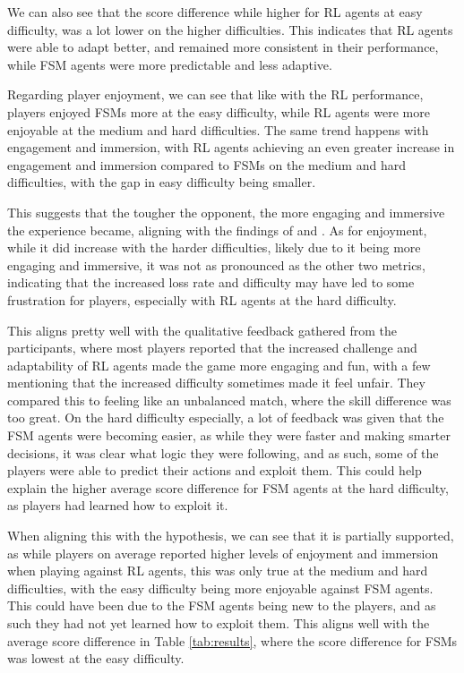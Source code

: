 \documentclass[conference]{IEEEtran}
\begin{document}
We can also see that the score difference while higher for RL agents at easy difficulty, was a lot lower on the higher difficulties. This indicates that RL agents were able to adapt better,
and remained more consistent in their performance, while FSM agents were more predictable and less adaptive.

Regarding player enjoyment, we can see that like with the RL performance, players enjoyed FSMs more at the easy difficulty, while RL agents were more enjoyable at the medium and hard difficulties.
The same trend happens with engagement and immersion, with RL agents achieving an even greater increase in engagement and immersion compared to FSMs on the medium and hard difficulties,
with the gap in easy difficulty being smaller.

This suggests that the tougher the opponent, the more engaging and immersive the experience became, aligning with the findings of \cite{grech_creating_2023} and \cite{vinyals_grandmaster_2019}.
As for enjoyment, while it did increase with the harder difficulties, likely due to it being more engaging and immersive, it was not as pronounced as the other two metrics, indicating that the increased
loss rate and difficulty may have led to some frustration for players, especially with RL agents at the hard difficulty.

This aligns pretty well with the qualitative feedback gathered from the participants, where most players reported that the increased challenge and adaptability of RL agents made the game more engaging and fun,
with a few mentioning that the increased difficulty sometimes made it feel unfair. They compared this to feeling like an unbalanced match, where the skill difference was too great.
On the hard difficulty especially, a lot of feedback was given that the FSM agents were becoming easier, as while they were faster and making smarter decisions, it was clear what logic they were following,
and as such, some of the players were able to predict their actions and exploit them. This could help explain the higher average score difference for FSM agents at the hard difficulty, as players had learned
how to exploit it.

When aligning this with the hypothesis, we can see that it is partially supported, as while players on average reported higher levels of enjoyment and immersion when playing against RL agents,
this was only true at the medium and hard difficulties, with the easy difficulty being more enjoyable against FSM agents. This could have been due to the FSM agents being new to the players, and as such they
had not yet learned how to exploit them. This aligns well with the average score difference in Table \ref{tab:results}, where the score difference for FSMs was lowest at the easy difficulty.
\end{document}
